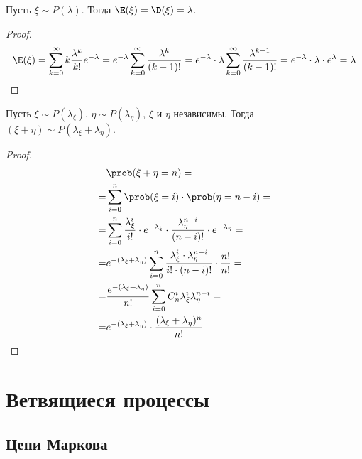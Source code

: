 \documentclass[12pt]{article}
\begin{document}
\begin{theorem}
    Пусть $\xi\sim P(\lambda)$. Тогда $\E(\xi)=\D(\xi)=\lambda$.
\end{theorem}
\begin{proof}
    $$\E(\xi)=\sum_{k=0}^{\infty}k\dfrac{\lambda^k}{k!}e^{-\lambda}=e^{-\lambda}\sum_{k=0}^{\infty}\dfrac{\lambda^k}{(k-1)!}=e^{-\lambda}\cdot\lambda\sum_{k=0}^{\infty}\dfrac{\lambda^{k-1}}{(k-1)!}=e^{-\lambda}\cdot\lambda\cdot e^\lambda=\lambda$$
\end{proof}
\begin{lemma}
    Пусть $\xi\sim P(\lambda_\xi)$, $\eta\sim P(\lambda_\eta)$, $\xi$ и $\eta$ независимы. Тогда $(\xi+\eta)\sim P(\lambda_\xi+\lambda_\eta)$.
\end{lemma}
\begin{proof}
    \begin{align*}
        &\prob(\xi+\eta=n)=\\
        =&\sum_{i=0}^{n}\prob(\xi=i)\cdot\prob(\eta=n-i)=\\
        =&\sum_{i=0}^{n}\dfrac{\lambda_\xi^i}{i!}\cdot e^{-\lambda_\xi}\cdot \dfrac{\lambda_\eta^{n-i}}{(n-i)!}\cdot e^{-\lambda_\eta}=\\
        =&e^{-(\lambda_\xi+\lambda_\eta)}\sum_{i=0}^{n}\dfrac{\lambda_\xi^i\cdot\lambda_\eta^{n-i}}{i!\cdot(n-i)!}\cdot \dfrac{n!}{n!}=\\
        =&\dfrac{e^{-(\lambda_\xi+\lambda_\eta)}}{n!}\sum_{i=0}^{n}C_n^i\lambda_\xi^i\lambda_\eta^{n-i}=\\
        =&e^{-(\lambda_\xi+\lambda_\eta)}\cdot \dfrac{(\lambda_\xi+\lambda_\eta)^n}{n!}
    \end{align*}
\end{proof}

\section{Ветвящиеся процессы}

\subsection{Цепи Маркова}
\end{document}

